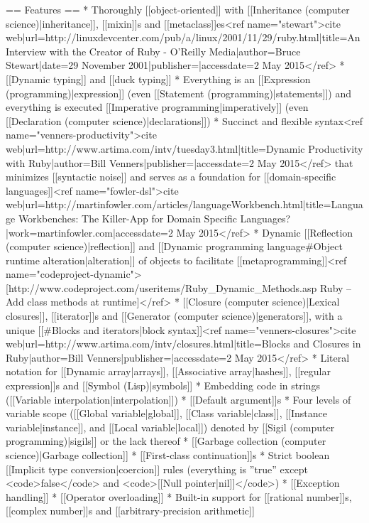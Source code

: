 == Features ==
* Thoroughly [[object-oriented]] with [[Inheritance (computer science)|inheritance]], [[mixin]]s and [[metaclass]]es<ref name="stewart">{{cite web|url=http://linuxdevcenter.com/pub/a/linux/2001/11/29/ruby.html|title=An Interview with the Creator of Ruby - O'Reilly Media|author=Bruce Stewart|date=29 November 2001|publisher=|accessdate=2 May 2015}}</ref>
* [[Dynamic typing]] and [[duck typing]]
* Everything is an [[Expression (programming)|expression]] (even [[Statement (programming)|statements]]) and everything is executed [[Imperative programming|imperatively]] (even [[Declaration (computer science)|declarations]])
* Succinct and flexible syntax<ref name="venners-productivity">{{cite web|url=http://www.artima.com/intv/tuesday3.html|title=Dynamic Productivity with Ruby|author=Bill Venners|publisher=|accessdate=2 May 2015}}</ref> that minimizes [[syntactic noise]] and serves as a foundation for [[domain-specific languages]]<ref name="fowler-dsl">{{cite web|url=http://martinfowler.com/articles/languageWorkbench.html|title=Language Workbenches: The Killer-App for Domain Specific Languages?|work=martinfowler.com|accessdate=2 May 2015}}</ref>
* Dynamic [[Reflection (computer science)|reflection]] and [[Dynamic programming language#Object runtime alteration|alteration]] of objects to facilitate [[metaprogramming]]<ref name="codeproject-dynamic">[http://www.codeproject.com/useritems/Ruby_Dynamic_Methods.asp Ruby – Add class methods at runtime]</ref>
* [[Closure (computer science)|Lexical closures]], [[iterator]]s and [[Generator (computer science)|generators]], with a unique [[#Blocks and iterators|block syntax]]<ref name="venners-closures">{{cite web|url=http://www.artima.com/intv/closures.html|title=Blocks and Closures in Ruby|author=Bill Venners|publisher=|accessdate=2 May 2015}}</ref>
* Literal notation for [[Dynamic array|arrays]], [[Associative array|hashes]], [[regular expression]]s and [[Symbol (Lisp)|symbols]]
* Embedding code in strings ([[Variable interpolation|interpolation]])
* [[Default argument]]s
* Four levels of variable scope ([[Global variable|global]], [[Class variable|class]], [[Instance variable|instance]], and [[Local variable|local]]) denoted by [[Sigil (computer programming)|sigils]] or the lack thereof
* [[Garbage collection (computer science)|Garbage collection]]
* [[First-class continuation]]s
* Strict boolean [[Implicit type conversion|coercion]] rules (everything is ''true'' except <code>false</code> and <code>[[Null pointer|nil]]</code>)
* [[Exception handling]]
* [[Operator overloading]]
* Built-in support for [[rational number]]s, [[complex number]]s and [[arbitrary-precision arithmetic]]

